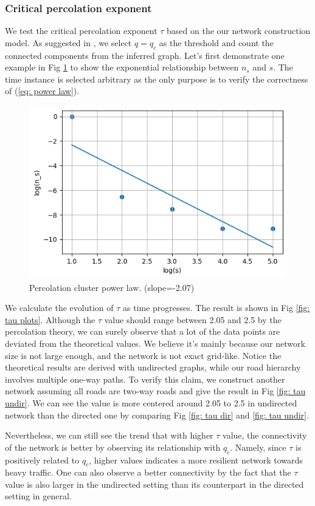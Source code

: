 \subsubsection{Critical percolation exponent}
We test the critical percolation exponent $\tau$ based on the our network construction model. As suggested in \cite{zeng2019switch}, we select $q=q_c$ as the threshold and count the connected components from the inferred graph. Let's first demonstrate one example in Fig \ref{fig: power law} to show the exponential relationship between $n_s$ and $s$. The time instance is selected arbitrary as the only purpose is to verify the correctness of (\ref{eq: power law}).

\begin{figure}[bt]
    \centering
    \includegraphics[width=0.7\linewidth]{images/linear_fit.png}
    \caption{Percolation cluster power law. (slope=-2.07)}
    \label{fig: power law}
\end{figure}

We calculate the evolution of $\tau$ as time progresses. The result is shown in Fig \ref{fig: tau plots}. Although the $\tau$ value should range between 2.05 and 2.5 by the percolation theory, we can surely observe that a lot of the data points are deviated from the theoretical values. We believe it's mainly because our network size is not large enough, and the network is not exact grid-like. Notice the theoretical results are derived with undirected graphs, while our road hierarchy involves multiple one-way paths. To verify this claim, we construct another network assuming all roads are two-way roads and give the result in Fig \ref{fig: tau undir}. We can see the value is more centered around 2.05 to 2.5 in undirected network than the directed one by comparing Fig \ref{fig: tau dir} and \ref{fig: tau undir}.

Nevertheless, we can still see the trend that with higher $\tau$ value, the connectivity of the network is better by observing its relationship with $q_c$. Namely, since $\tau$ is positively related to $q_c$, higher values indicates a more resilient network towards heavy traffic. One can also observe a better connectivity by the fact that the $\tau$ value is also larger in the undirected setting than its counterpart in the directed setting in general.

